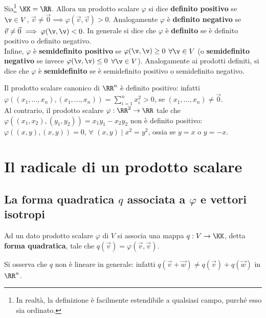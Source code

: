 \begin{definition}
	Sia\footnote{In realtà, la definizione è facilmente estendibile a qualsiasi campo, purché esso
		sia ordinato.} $\KK = \RR$. Allora un prodotto scalare $\varphi$ si dice \textbf{definito positivo} se $\v \in V$, $\vec{v} \neq \vec{0} \implies
	\varphi(\vec{v}, \vec{v}) > 0$. Analogamente $\varphi$ è \textbf{definito negativo} se $\vec{v} \neq \vec 0 \implies \varphi(\v, \v) < 0$. In generale si dice che $\varphi$ è \textbf{definito} se è definito positivo o
	definito negativo. \\
	
	Infine, $\varphi$ è \textbf{semidefinito positivo} se $\varphi(\v, \v) \geq 0$ $\forall \v \in V$ (o
	\textbf{semidefinito negativo} se invece $\varphi(\v, \v) \leq 0$ $\forall \v \in V$). Analogamente ai
	prodotti definiti, si dice che $\varphi$ è \textbf{semidefinito} se è semidefinito positivo o semidefinito
	negativo.
\end{definition}

\begin{example}
	Il prodotto scalare canonico di $\RR^n$ è definito positivo: infatti $\varphi((x_1, ..., x_n), (x_1, ..., x_n)) =
	\sum_{i=1}^n x_i^2  > 0$, se $(x_1, ..., x_n) \neq \vec 0$. \\
	
	Al contrario, il prodotto scalare $\varphi : \RR^2 \to \RR$ tale che $\varphi((x_1, x_2), (y_1, y_2)) = x_1 y_1 - x_2 y_2$ non è definito positivo: $\varphi((x, y), (x, y)) = 0$, $\forall$ $(x, y) \mid x^2 = y^2$, ossia se
	$y = x$ o $y = -x$.
\end{example}

\section{Il radicale di un prodotto scalare}

\subsection{La forma quadratica $q$ associata a \texorpdfstring{$\varphi$}{φ} e vettori isotropi}

\begin{definition}
	Ad un dato prodotto scalare $\varphi$ di $V$ si associa una mappa
	$q : V \to \KK$, detta \textbf{forma quadratica}, tale che $q(\vec{v}) = \varphi(\vec{v}, \vec{v})$.
\end{definition}

\begin{remark}
	Si osserva che $q$ non è lineare in generale: infatti $q(\vec{v} + \vec{w}) \neq q(\vec{v}) + q(\vec{w})$ in
	$\RR^n$.
\end{remark}

